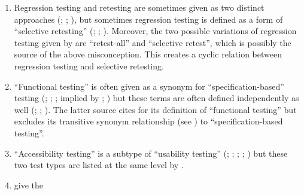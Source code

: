 \begin{enumerate}
    \item %
          Regression testing and retesting are sometimes given as two distinct
          approaches (\citealp[p.~8]{IEEE2022}; \citealp[p.~3]{IEEE2021a};
          \citealp[p.~34]{Firesmith2015}), but sometimes regression testing is
          defined as a form of ``selective retesting'' (\citealp[p.~372]{IEEE2017};
          \citealp[pp.~5\=/8, 6\=/5, 7\=/5 to 7\=/6]{SWEBOK2024};
          \citealp[p.~3]{BarbosaEtAl2006}). Moreover, the two possible variations
          of regression testing given by \citet[p.~411]{vanVliet2000} are
          ``retest-all'' and ``selective retest'', which is possibly the source
          of the above misconception. This creates a cyclic
          relation between regression testing and selective retesting.
    \item %
          ``Functional testing'' is often given as a synonym for
          ``specification-based'' testing (\citealp[p.~196]{IEEE2017};
          \citealp[pp.~44\==45, 48]{Kam2008}; \citealp[p.~399]{vanVliet2000};
          implied by \citealp[p.~129]{IEEE2021c}; \citeyear[p.~431]{IEEE2017})
          but these terms are often defined independently as well
          (\citeyear[Fig.~2]{IEEE2022}; \citeyear[pp.~8, 49, 125]{IEEE2021c};
          \citealpISTQB{}). The latter source cites \citet[p.~431]{IEEE2017}
          for its definition of ``functional testing'' but excludes its
          transitive synonym relationship (see ) to
          ``specification-based testing''.
    \item %
          ``Accessibility testing'' is a subtype of ``usability testing''
          (\citealp[p.~1]{IEEE2022}; \citeyear[Tab.~A.1]{IEEE2021c};
          \citeyear[p.~6]{IEEE2017}; \citealp{ISO_IEC2011};
          \citealp[p.~58]{Firesmith2015}) but these two test types are listed
          at the same level by \citet[Fig.~2]{IEEE2022}.
    \item %
          \citet[p.~34]{IEEE2022} give the

\end{enumerate}
